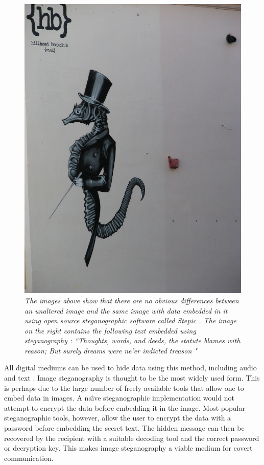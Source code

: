 \documentclass[12pt]{extreport}
\begin{document}
\begin{figure}[h!]
\includegraphics[scale=0.10]{hb1}
\caption{\emph{The images above show that there are no obvious differences between an unaltered image and the same image with data embedded in it using open source steganographic software called Stepic \cite{stepnic}. The image on the right contains the following text embedded using steganography : ``Thoughts, words, and deeds, the statute blames with reason;  But surely dreams were ne'er indicted treason \cite{burns}"}}
\label{fig:stegexample}
\end{figure} All digital mediums \cite{pan2007intelligent} can be used to hide data using this method, including audio \cite{crawford2010supraliminal} and text \cite{shirali2006new}. Image steganography is thought to be the most widely used form. This is perhaps due to the large number of freely available tools that allow one to embed data in images. A na\^{\i}ve steganographic implementation would not attempt to encrypt the data before embedding it in the image. Most popular steganographic tools, however, allow the user to encrypt the data with a password before embedding the secret text. The hidden message can then be recovered by the recipient with a suitable decoding tool and the correct password or decryption key. This makes image steganography a viable medium for covert communication.  
\end{document}

